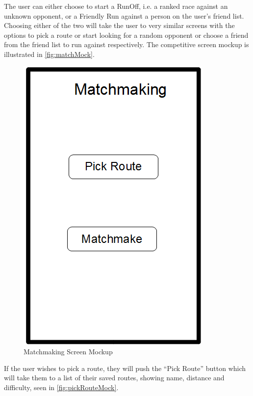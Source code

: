 The user can either choose to start a RunOff, i.e. a ranked race against an unknown opponent, or a Friendly Run against a person on the user's friend list. Choosing either of the two will take the user to very similar screens with the options to pick a route or start looking for a random opponent or choose a friend from the friend list to run against respectively. The competitive screen mockup is illustrated in \autoref{fig:matchMock}.

\begin{figure}[!ht]
	\begin{center}
		\includegraphics[scale=0.4]{img/matchMock.png}
		\caption{Matchmaking Screen Mockup}
		\label{fig:matchMock}
	\end{center}
\end{figure}

If the user wishes to pick a route, they will push the ``Pick Route'' button which will take them to a list of their saved routes, showing name, distance and difficulty, seen in \autoref{fig:pickRouteMock}.

